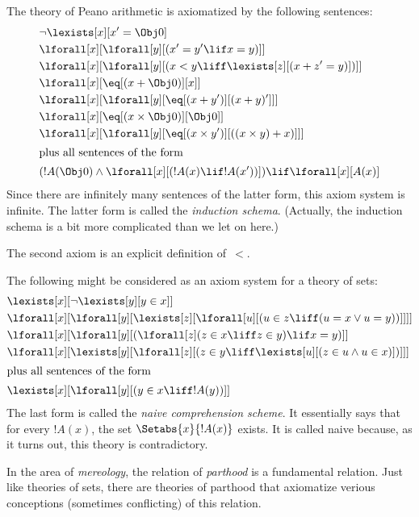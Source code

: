 \documentclass[../../include/open-logic-section]{subfiles}
\begin{document}
\begin{ex}
The theory of Peano arithmetic is axiomatized by the following sentences:
\begin{align*}
& \lnot\lexists[x][x' = \Obj 0]\\
& \lforall[x][\lforall[y][(x' = y' \lif x = y)]]\\
& \lforall[x][\lforall[y][(x < y \liff \lexists[z][(x + z' = y)])]]\\
& \lforall[x][\eq[(x + \Obj 0)][x]]\\
& \lforall[x][\lforall[y][\eq[(x + y')][(x + y)']]]\\
& \lforall[x][\eq[(x \times \Obj 0)][\Obj 0]]\\
& \lforall[x][\lforall[y][\eq[(x \times y')][((x \times y) + x)]]]\\
\intertext{plus all sentences of the form}
& (!A(\Obj 0) \land \lforall[x][(!A(x) \lif !A(x'))]) \lif \lforall[x][A(x)]
\end{align*}
Since there are infinitely many sentences of the latter form, this
axiom system is infinite.  The latter form is called the
\emph{induction schema}. (Actually, the induction schema is a bit more
complicated than we let on here.)

The second axiom is an explicit definition of~$<$.  
\end{ex}

\begin{ex}
The following might be considered as an axiom system for a theory of sets:
\begin{align*}
& \lexists[x][\lnot \lexists[y][y \in x]]\\ 
& \lforall[x][\lforall[y][\lexists[z][\lforall[u][(u \in z \liff (u =
          x \lor u = y))]]]]\\ 
& \lforall[x][\lforall[y][(\lforall[z](z \in x \liff z \in y) \lif x =
      y)]]\\ 
& \lforall[x][\lexists[y][\lforall[z][(z \in y \liff \lexists[u][(z \in
        u \land u \in x)])]]]\\ 
\intertext{plus all sentences of the form} &
\lexists[x][\lforall[y][(y \in x \liff !A(y))]]
\end{align*}
The last form is called the \emph{naive comprehension scheme}.  It
essentially says that for every $!A(x)$, the set $\Setabs{x}{!A(x)}$
exists. It is called naive because, as it turns out, this theory is
contradictory.
\end{ex}


\begin{ex}
In the area of \emph{mereology}, the relation of \emph{parthood} is a
fundamental relation. Just like theories of sets, there are theories
of parthood that axiomatize verious conceptions (sometimes
conflicting) of this relation.  
\end{ex}
\end{document}
